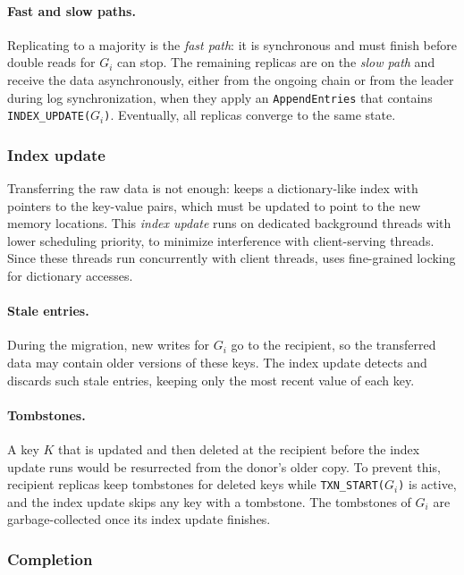 \paragraph{Fast and slow paths.}
Replicating to a majority is the \emph{fast path}: it is synchronous and must finish before double reads for $G_i$ can stop.
The remaining replicas are on the \emph{slow path} and receive the data asynchronously, either from the ongoing chain or from the leader during log synchronization, when they apply an \texttt{AppendEntries} that contains \texttt{INDEX\_UPDATE($G_i$)}.
Eventually, all replicas converge to the same state.

\subsubsection{Index update}
\label{sec:index_updating}

Transferring the raw data is not enough: \OurImplementation{} keeps a dictionary-like index with pointers to the key-value pairs, which must be updated to point to the new memory locations.
This \emph{index update} runs on dedicated background threads with lower scheduling priority, to minimize interference with client-serving threads.
Since these threads run concurrently with client threads, \OurImplementation{} uses fine-grained locking for dictionary accesses.

\paragraph{Stale entries.}
During the migration, new writes for $G_i$ go to the recipient, so the transferred data may contain older versions of these keys.
The index update detects and discards such stale entries, keeping only the most recent value of each key.

\paragraph{Tombstones.}
A key $K$ that is updated and then deleted at the recipient before the index update runs would be resurrected from the donor's older copy.
To prevent this, recipient replicas keep tombstones for deleted keys while \texttt{TXN\_START($G_i$)} is active, and the index update skips any key with a tombstone.
The tombstones of $G_i$ are garbage-collected once its index update finishes.

\subsubsection{Completion}
\label{sec:commit-completion}

